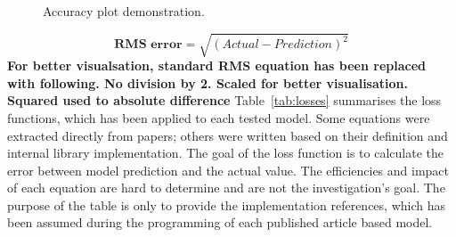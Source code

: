 %
%
\begin{figure}[ht]
    \centering
    
    \caption{Accuracy plot demonstration.}
    \label{fig:plot_demo}
\end{figure}
\begin{equation}
    \textbf{RMS error}  = \sqrt{(Actual-Prediction)^2}
    \label{eq:rms-error}
\end{equation}
\textbf{For better visualsation, standard RMS equation has been replaced with following. No division by 2. Scaled for better visualisation. Squared used to absolute difference}
\mbox{Table~\ref{tab:losses}} summarises the loss functions, which has been applied to each tested model.
Some equations were extracted directly from papers; others were written based on their definition and internal library implementation.
The goal of the loss function is to calculate the error between model prediction and the actual value.
The efficiencies and impact of each equation are hard to determine and are not the investigation's goal.
The purpose of the table is only to provide the implementation references, which has been assumed during the programming of each published article based model.
